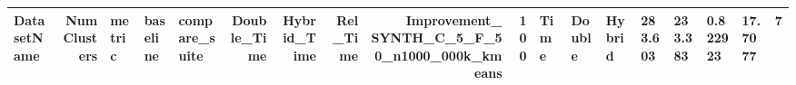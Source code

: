 \begin{tabular}{lrlllrrrrr}
\toprule
DatasetName & NumClusters & metric & baseline & compare_suite & Double_Time & Hybrid_Time & Rel_Time & Improvement_%
\midrule
SYNTH_C_5_F_50_n1000_000k_kmeans & 100 & Time & Double & Hybrid & 283.603 & 233.383 & 0.822923 & 17.7077 & 7 \\
\bottomrule
\end{tabular}
